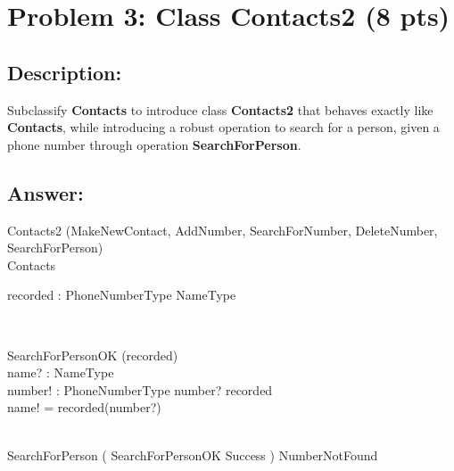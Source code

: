 \newpage
\section{Problem 3: Class Contacts2 (8 pts)}

\subsection{Description:}
Subclassify \textbf{Contacts} to introduce class \textbf{Contacts2} that behaves exactly like \textbf{Contacts},
while introducing a robust operation to search for a person, given a phone number through
operation \textbf{SearchForPerson}.

\subsection{Answer:}

\begin{class}{Contacts2}
\also
\upharpoonright (MakeNewContact, AddNumber, SearchForNumber, DeleteNumber,\\ SearchForPerson) \\
Contacts\\
\begin{state}
 recorded : PhoneNumberType \pfun NameType
\end{state} \\
\begin{op}{SearchForPersonOK}
\Xi (recorded) \\
name? : NameType\\
number! : PhoneNumberType
\ST
number? \in recorded\\
name! = recorded(number?)
\end{op}\\
\also
SearchForPerson \sdef ( SearchForPersonOK \land Success ) \oplus NumberNotFound\\
\end{class}


